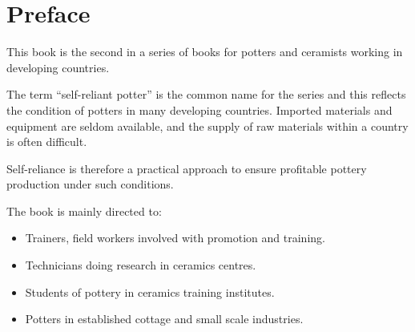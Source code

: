 \chapter*{Preface}
This book is the second in a series of books for potters and ceramists working 
in developing countries. 

The term ``self-reliant potter'' is the common name for the series and this 
reflects the condition of potters in many developing countries. Imported 
materials and equipment are seldom available, and the supply of raw materials 
within a country is often difficult.

Self-reliance is therefore a practical approach to ensure profitable pottery 
production under such conditions.

The book is mainly directed to:
\begin{itemize}
  \item Trainers, field workers involved with promotion and training.
  \item Technicians doing research in ceramics centres.
  \item Students of pottery in ceramics training institutes.
  \item Potters in established cottage and small scale industries.
\end{itemize}
